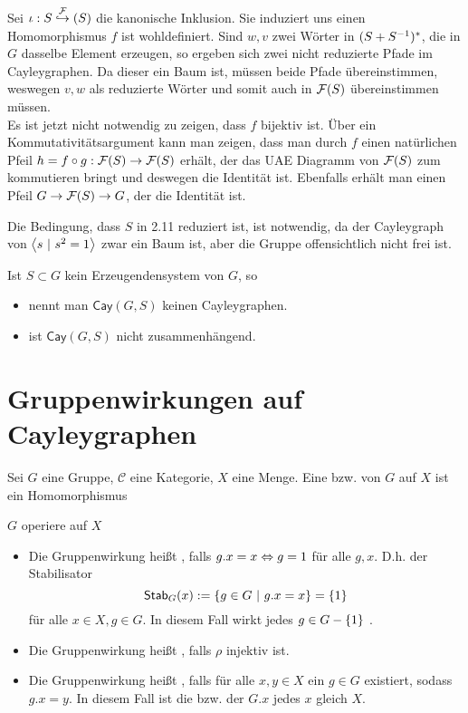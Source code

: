 \documentclass{article}
\newcommand{\tm}{\subset}
\newcommand{\Stab}[2]{\textsf{Stab}_{#1}(#2)}
\newcommand{\Cay}[2]{\textsf{Cay}(#1,#2)}
\renewcommand{\C}{\mathcal{C}}
\begin{document}
\begin{Beweis}{}
Sei $\iota : S \overset{\mathcal{F}}{\hookrightarrow}(S)$ die kanonische Inklusion. Sie induziert uns einen Homomorphismus
$f$ ist wohldefiniert. Sind $w, v$ zwei Wörter in $(S + S^{-1})^*$, die in $G$ dasselbe Element erzeugen, so ergeben sich zwei nicht reduzierte Pfade im Cayleygraphen. Da dieser ein Baum ist, müssen beide Pfade übereinstimmen, weswegen $v,w$ als reduzierte Wörter und somit auch in $\mathcal{F}(S)$ übereinstimmen müssen.\\
Es ist jetzt nicht notwendig zu zeigen, dass $f$ bijektiv ist. Über ein Kommutativitätsargument kann man zeigen, dass man durch $f$ einen natürlichen Pfeil $h = f \circ g : \mathcal{F}(S) \rightarrow \mathcal{F}(S)$ erhält, der das UAE Diagramm von $\mathcal{F}(S)$ zum kommutieren bringt und deswegen die Identität ist. Ebenfalls erhält man einen Pfeil $G \overset{}{\rightarrow} \mathcal{F}(S) \overset{}{\rightarrow} G$, der die Identität ist.
\end{Beweis}

Die Bedingung, dass $S$ in 2.11 reduziert ist, ist notwendig, da der Cayleygraph von
$\grp{s}{s^2 = 1}$
zwar ein Baum ist, aber die Gruppe offensichtlich nicht frei ist.

\Bem{}
Ist $S \tm G$ kein Erzeugendensystem von $G$, so
\begin{itemize}
\item nennt man $\Cay{G}{S}$ keinen Cayleygraphen.
\item ist $\Cay{G}{S}$ nicht zusammenhängend.
\end{itemize}

\newpage
\section{Gruppenwirkungen auf Cayleygraphen}
\Def{}
Sei $G$ eine Gruppe, $\C$ eine Kategorie, $X$ eine Menge. Eine  bzw.  von $G$ auf $X$ ist ein Homomorphismus


\Def{}
$G$ operiere auf $X$
\begin{itemize}
\item Die Gruppenwirkung heißt , falls $g.x = x \overset{}{\Leftrightarrow} g = 1$ für alle $g,x$. D.h. der Stabilisator
\[\Stab{G}{x} := \set{g \in G}{g.x = x}= \set{1}{}\]
für alle $x\in X, g \in G$. In diesem Fall wirkt jedes $g \in G- \set{1}{}$ .
\item Die Gruppenwirkung heißt , falls $\rho$ injektiv ist.
\item Die Gruppenwirkung heißt , falls für alle $x,y\in X$ ein $g\in G$ existiert, sodass $g.x = y$. In diesem Fall ist die  bzw. der  $G.x$ jedes $x$ gleich $X$.
\end{itemize}
\end{document}
